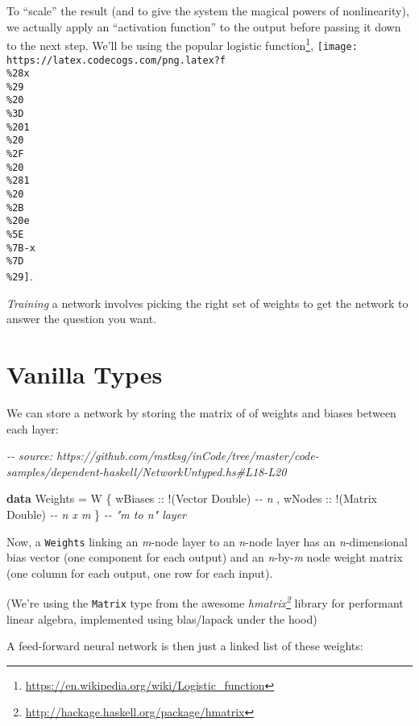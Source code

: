 \documentclass[]{article}
\newenvironment{Shaded}{}{}
\newcommand{\CommentTok}[1]{\textcolor[rgb]{0.38,0.63,0.69}{\textit{#1}}}
\newcommand{\DataTypeTok}[1]{\textcolor[rgb]{0.56,0.13,0.00}{#1}}
\newcommand{\KeywordTok}[1]{\textcolor[rgb]{0.00,0.44,0.13}{\textbf{#1}}}
\newcommand{\NormalTok}[1]{#1}
\newcommand{\OperatorTok}[1]{\textcolor[rgb]{0.40,0.40,0.40}{#1}}
\newcommand{\OtherTok}[1]{\textcolor[rgb]{0.00,0.44,0.13}{#1}}
\renewcommand{\href}[2]{#2\footnote{\url{#1}}}
\begin{document}
To ``scale'' the result (and to give the system the magical powers of
nonlinearity), we actually apply an ``activation function'' to the output before
passing it down to the next step. We'll be using the popular
\href{https://en.wikipedia.org/wiki/Logistic_function}{logistic function},
\texttt{[image: https://latex.codecogs.com/png.latex?f\\\%28x\\\%29\\\%20\\\%3D\\\%201\\\%20\\\%2F\\\%20\\\%281\\\%20\\\%2B\\\%20e\\\%5E\\\%7B-x\\\%7D\\\%29]}.

\emph{Training} a network involves picking the right set of weights to get the
network to answer the question you want.

\hypertarget{vanilla-types}{%
\section{Vanilla Types}\label{vanilla-types}}

We can store a network by storing the matrix of of weights and biases between
each layer:

\begin{Shaded}
\begin{Highlighting}[]
\CommentTok{{-}{-} source: https://github.com/mstksg/inCode/tree/master/code{-}samples/dependent{-}haskell/NetworkUntyped.hs\#L18{-}L20}

\KeywordTok{data} \DataTypeTok{Weights} \OtherTok{=} \DataTypeTok{W}\NormalTok{ \{}\OtherTok{ wBiases ::} \OperatorTok{!}\NormalTok{(}\DataTypeTok{Vector} \DataTypeTok{Double}\NormalTok{)  }\CommentTok{{-}{-} n}
\NormalTok{                 ,}\OtherTok{ wNodes  ::} \OperatorTok{!}\NormalTok{(}\DataTypeTok{Matrix} \DataTypeTok{Double}\NormalTok{)  }\CommentTok{{-}{-} n x m}
\NormalTok{                 \}                              }\CommentTok{{-}{-} "m to n" layer}
\end{Highlighting}
\end{Shaded}

Now, a \texttt{Weights} linking an \emph{m}-node layer to an \emph{n}-node layer
has an \emph{n}-dimensional bias vector (one component for each output) and an
\emph{n}-by-\emph{m} node weight matrix (one column for each output, one row for
each input).

(We're using the \texttt{Matrix} type from the awesome
\emph{\href{http://hackage.haskell.org/package/hmatrix}{hmatrix}} library for
performant linear algebra, implemented using blas/lapack under the hood)

A feed-forward neural network is then just a linked list of these weights:
\end{document}
